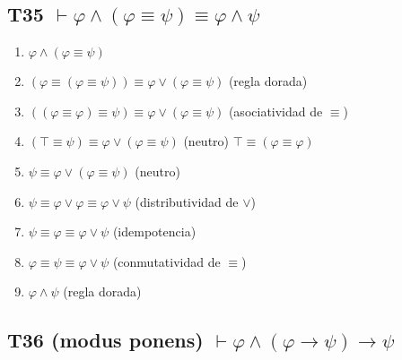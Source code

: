 \subsection{T35 $\vdash \varphi \land (\varphi \equiv \psi) \equiv \varphi \land \psi$}

\begin{enumerate}
    \item $\varphi \land (\varphi \equiv \psi)$
    \item $(\varphi \equiv (\varphi \equiv \psi)) \equiv \varphi \lor (\varphi \equiv \psi)$ \hfill (regla dorada)
    \item $((\varphi \equiv \varphi) \equiv \psi) \equiv \varphi \lor (\varphi \equiv \psi)$ \hfill (asociatividad de $\equiv$)
    \item $(\top \equiv \psi) \equiv \varphi \lor (\varphi \equiv \psi)$ \hfill (neutro) $\top \equiv (\varphi \equiv \varphi)$
    \item $\psi \equiv \varphi \lor (\varphi \equiv \psi)$ \hfill (neutro)
    \item $\psi \equiv \varphi \lor \varphi \equiv \varphi \lor \psi$ \hfill (distributividad de $\lor$)
    \item $\psi \equiv \varphi \equiv \varphi \lor \psi$ \hfill (idempotencia)
    \item $\varphi \equiv \psi \equiv \varphi \lor \psi$ \hfill (conmutatividad de $\equiv$)
    \item $\varphi \land \psi$ \hfill (regla dorada)
\end{enumerate}

\subsection{T36 (modus ponens) $\vdash \varphi \land (\varphi \rightarrow \psi) \rightarrow \psi$}

